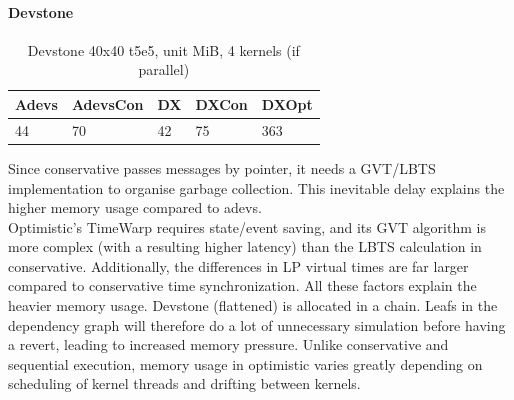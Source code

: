 \paragraph*{Devstone}
\begin{table}[htb]
	\centering
	\caption{Devstone 40x40 t5e5, unit MiB, 4 kernels (if parallel)}
	\label{dtone_mem}
	\begin{tabular}{| l | l | l | l | l |}
		\hline
		Adevs & AdevsCon &DX &DXCon &DXOpt\\ \hline
		44 & 70 & 42 & 75 & 363  \\ \hline
	\end{tabular}
\end{table}
Since conservative passes messages by pointer, it needs a GVT/LBTS implementation to organise garbage collection. This inevitable delay explains the higher memory usage compared to adevs.\\
Optimistic's TimeWarp requires state/event saving, and its GVT algorithm is more complex (with a resulting higher latency) than the LBTS calculation in conservative. 
Additionally, the differences in LP virtual times are far larger compared to conservative time synchronization. All these factors explain the heavier memory usage. Devstone (flattened) is allocated in a chain. Leafs in the dependency graph will therefore do a lot of unnecessary simulation before having a revert, leading to increased memory pressure. Unlike conservative and sequential execution, memory usage in optimistic varies greatly depending on scheduling of kernel threads and drifting between kernels. 
